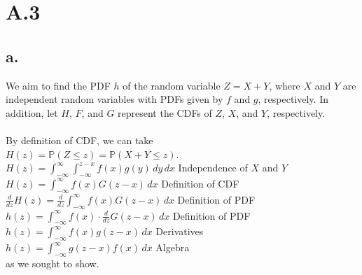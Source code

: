 \documentclass{article}
\newcommand{\1}{\mathbf{1}}
\renewcommand{\P}{\mathbb{P}}
\begin{document}
\section*{A.3}
{\Large 

\subsection*{a.}
We aim to find the PDF $h$ of the random variable $Z = X + Y$, where $X$ and $Y$ are independent random variables with PDFs given by $f$ and $g$, respectively. In addition, let $H$, $F$, and $G$ represent the CDFs of $Z$, $X$, and $Y$, respectively. \\ \\
By definition of CDF, we can take \\ 
$H(z) = \P(Z \leq z) = \P(X + Y \leq z)$. \\
$H(z) = \int_{-\infty}^{\infty} \int_{-\infty}^{z-x} f(x) g(y) \,dy \,dx$ \hfill Independence of $X$ and $Y$ \\ 
$H(z) = \int_{-\infty}^{\infty} f(x) G(z - x) \,dx$ \hfill Definition of CDF \\ 
$\frac{d}{dz} H(z) = \frac{d}{dz} \int_{-\infty}^{\infty} f(x) G(z - x) \,dx$ \hfill Definition of PDF \\ 
$h(z) = \int_{-\infty}^{\infty} f(x) \cdot \frac{d}{dz} G(z - x) \,dx$ \hfill Definition of PDF \\ 
$h(z) = \int_{-\infty}^{\infty} f(x) g(z - x) \,dx$ \hfill Derivatives \\ 
$h(z) = \int_{-\infty}^{\infty} g(z-x) f(x) \,dx$ \hfill Algebra \\
as we sought to show.

}
\end{document}
